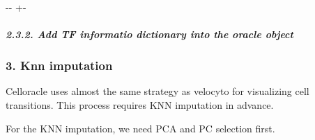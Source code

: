 \documentclass[letterpaper,10pt,english]{sphinxmanual}
\newlength\nbsphinxcodecellspacing
\begin{document}
{

\kern-\sphinxverbatimsmallskipamount\kern-\baselineskip
\kern+\FrameHeightAdjust\kern-\fboxrule
\vspace{\nbsphinxcodecellspacing}

\begin{sphinxVerbatim}[commandchars=\\\{\}]

\end{sphinxVerbatim}
}


\subparagraph{2.3.2. Add TF informatio dictionary into the oracle object}
\label{\detokenize{notebooks/04_Network_analysis/Network_analysis_with_with_Paul_etal_2015_data:2.3.2.-Add-TF-informatio-dictionary-into-the-oracle-object}}
{
\begin{sphinxVerbatim}[commandchars=\\\{\}]
\llap{\color{nbsphinxin}[14]:\,\hspace{\fboxrule}\hspace{\fboxsep}}
\end{sphinxVerbatim}
}


\subsubsection{3. Knn imputation}
\label{\detokenize{notebooks/04_Network_analysis/Network_analysis_with_with_Paul_etal_2015_data:3.-Knn-imputation}}
Celloracle uses almost the same strategy as velocyto for visualizing cell transitions. This process requires KNN imputation in advance.

For the KNN imputation, we need PCA and PC selection first.
\end{document}

